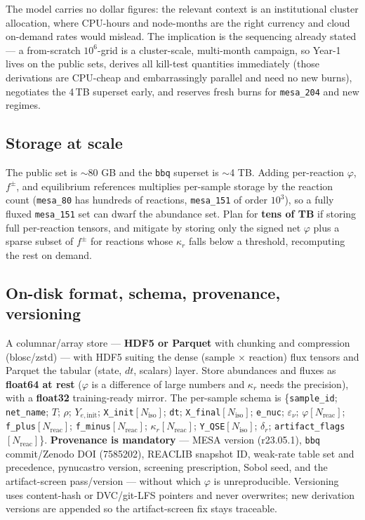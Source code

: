 \documentclass[11pt]{article}
\newcommand{\bbq}{\texttt{bbq}}
\begin{document}
The model carries no dollar figures: the relevant context is an institutional cluster allocation, where CPU-hours and node-months are the right currency and cloud on-demand rates would mislead. The implication is the sequencing already stated --- a from-scratch $10^6$-grid is a cluster-scale, multi-month campaign, so Year-1 lives on the public sets, derives all kill-test quantities immediately (those derivations are CPU-cheap and embarrassingly parallel and need no new burns), negotiates the 4\,TB superset early, and reserves fresh burns for \texttt{mesa\_204} and new regimes.

\subsection{Storage at scale}

The public set is $\sim$80 GB and the \bbq{} superset is $\sim$4 TB. Adding per-reaction $\varphi$, $f^{\pm}$, and equilibrium references multiplies per-sample storage by the reaction count (\texttt{mesa\_80} has hundreds of reactions, \texttt{mesa\_151} of order $10^3$), so a fully fluxed \texttt{mesa\_151} set can dwarf the abundance set. Plan for \textbf{tens of TB} if storing full per-reaction tensors, and mitigate by storing only the signed net $\varphi$ plus a sparse subset of $f^{\pm}$ for reactions whose $\kappa_r$ falls below a threshold, recomputing the rest on demand.

\subsection{On-disk format, schema, provenance, versioning}

A columnar/array store --- \textbf{HDF5 or Parquet} with chunking and compression (blosc/zstd) --- with HDF5 suiting the dense (sample $\times$ reaction) flux tensors and Parquet the tabular (state, $dt$, scalars) layer. Store abundances and fluxes as \textbf{float64 at rest} ($\varphi$ is a difference of large numbers and $\kappa_r$ needs the precision), with a \textbf{float32} training-ready mirror. The per-sample schema is \{\texttt{sample\_id}; \texttt{net\_name}; $T$; $\rho$; $Y_{e,\mathrm{init}}$; \texttt{X\_init}$[N_{\mathrm{iso}}]$; \texttt{dt}; \texttt{X\_final}$[N_{\mathrm{iso}}]$; \texttt{e\_nuc}; $\varepsilon_\nu$; $\varphi[N_{\mathrm{reac}}]$; \texttt{f\_plus}$[N_{\mathrm{reac}}]$; \texttt{f\_minus}$[N_{\mathrm{reac}}]$; $\kappa_r[N_{\mathrm{reac}}]$; \texttt{Y\_QSE}$[N_{\mathrm{iso}}]$; $\delta_r$; \texttt{artifact\_flags}$[N_{\mathrm{reac}}]$\}. \textbf{Provenance is mandatory} --- MESA version (r23.05.1), \bbq{} commit/Zenodo DOI (7585202), REACLIB snapshot ID, weak-rate table set and precedence, pynucastro version, screening prescription, Sobol seed, and the artifact-screen pass/version --- without which $\varphi$ is unreproducible. Versioning uses content-hash or DVC/git-LFS pointers and never overwrites; new derivation versions are appended so the artifact-screen fix stays traceable.
\end{document}
